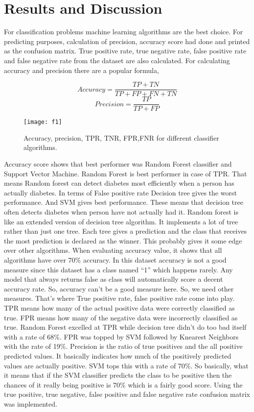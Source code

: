 \documentclass[conference]{IEEEtran}
\begin{document}
\section{Results and Discussion}
	For classification problems machine learning algorithms are the best choice. For predicting purposes, calculation of precision, accuracy score had done and printed as the confusion matrix. True positive rate, true negative rate, false positive rate and false negative rate from the dataset are also calculated. For calculating accuracy and precision there are a popular formula,
	
\begin{equation}
	Accuracy=\frac{TP+TN}{TP+FP+FN+TN}
\end{equation}
\begin{equation}
	Precision=\frac{TP}{TP+FP}
\end{equation}
	
\begin{figure}[!h]
		\centering
		\texttt{[image: f1]}
		\caption{Accuracy, precision, TPR, TNR, FPR,FNR for different classifier algorithms.}
\end{figure}
	Accuracy score shows that best performer was Random Forest classifier and Support Vector Machine. Random Forest is best performer in case of TPR. That means Random forest can detect diabetes most efficiently when a person has actually diabetes. In terms of False positive rate Decision tree gives the worst performance. And SVM gives best performance. These means that decision tree often detects diabetes when person have not actually had it. Random forest is like an extended version of decision tree algorithm. It implements a lot of tree rather than just one tree. Each tree gives a prediction and the class that receives the most prediction is declared as the winner. This probably gives it some edge over other algorithms. When evaluating accuracy value, it shows that all algorithms have over 70\% accuracy. In this dataset accuracy is not a good measure since this dataset has a class named “1” which happens rarely. Any model that always returns false as class will automatically score a decent accuracy rate. So, accuracy can’t be a good measure here. So, we need other measures. That’s where True positive rate, false positive rate come into play. TPR means how many of the actual positive data were correctly classified as true. FPR means how many of the negative data were incorrectly classified as true. Random Forest excelled at TPR while decision tree didn’t do too bad itself with a rate of 68\%. FPR was topped by SVM followed by Knearest Neighbors with the rate of 19\%. Precision is the ratio of true positives and the all positive predicted values. It basically indicates how much of the positively predicted values are actually positive. SVM tops this with a rate of 70\%. So basically, what it means that if the SVM classifier predicts the class to be positive then the chances of it really being positive is 70\% which is a fairly good score. Using the true positive, true negative, false positive and false negative rate confusion matrix was implemented.
	
\end{document}
